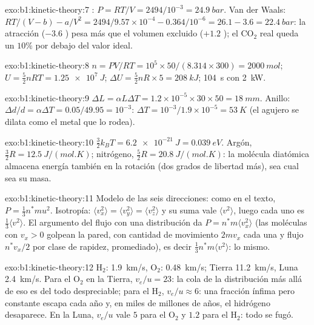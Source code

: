 \begin{solution}{exo:b1:kinetic-theory:7}
: $P = RT/V = 2494/10^{-3} = \qty{24.9}{bar}$. Van der Waals:
$RT/(V - b) - a/V^2 = 2494/9.57\times10^{-4} - 0.364/10^{-6} = 26.1 - 3.6 =
\qty{22.4}{bar}$: la atracción ($-3.6$ ) pesa más que el volumen
excluido ($+1.2$ ); el CO$_2$ real queda un $10\%$ por debajo del valor ideal.
\end{solution}

\begin{solution}{exo:b1:kinetic-theory:8}
$n = PV/RT = 10^5 \times 50/(8.314 \times 300) = \qty{2000}{mol}$; $U = \tfrac52
nRT = \qty{1.25e7}{J}$; $\Delta U = \tfrac52 nR \times 5 = \qty{208}{kJ}$;
\qty{104}{s} con \qty{2}{kW}.
\end{solution}

\begin{solution}{exo:b1:kinetic-theory:9}
$\Delta L = \alpha L\Delta T = 1.2\times10^{-5} \times 30 \times 50 = \qty{18}{mm}$.
Anillo: $\Delta d/d = \alpha\Delta T = 0.05/49.95 = 10^{-3}$: $\Delta T = 10^{-3}/
1.9\times10^{-5} = \qty{53}{K}$ (el agujero se dilata como el metal que lo rodea).
\end{solution}

\begin{solution}{exo:b1:kinetic-theory:10}
$\tfrac32 k_BT = \qty{6.2e-21}{J} = \qty{0.039}{eV}$. Argón, $\tfrac32 R =
\qty{12.5}{J/(mol.K)}$; nitrógeno, $\tfrac52 R = \qty{20.8}{J/(mol.K)}$: la
molécula diatómica almacena energía también en la rotación (dos grados de
libertad más), sea cual sea su masa.
\end{solution}

\begin{solution}{exo:b1:kinetic-theory:11}
Modelo de las seis direcciones: como en el texto, $P = \tfrac13 n^*mu^2$.
Isotropía: $\langle v_x^2\rangle = \langle v_y^2\rangle = \langle v_z^2\rangle$ y
su suma vale $\langle v^2\rangle$, luego cada uno es
$\tfrac13\langle v^2\rangle$. El argumento del flujo con una distribución da
$P = n^*m\langle v_x^2\rangle$ (las moléculas con $v_x > 0$ golpean la pared,
con cantidad de movimiento $2mv_x$ cada una y flujo $n^*v_x/2$ por clase de
rapidez, promediado), es decir $\tfrac13 n^*m\langle v^2\rangle$: lo mismo.
\end{solution}

\begin{solution}{exo:b1:kinetic-theory:12}
H$_2$: \qty{1.9}{km/s}, O$_2$: \qty{0.48}{km/s}; Tierra \qty{11.2}{km/s},
Luna \qty{2.4}{km/s}. Para el O$_2$ en la Tierra, $v_e/u = 23$: la cola de
la distribución más allá de eso es del todo despreciable; para el H$_2$,
$v_e/u \approx 6$: una fracción ínfima pero constante escapa cada año y, en
miles de millones de años, el hidrógeno desaparece. En la Luna, $v_e/u$
vale $5$ para el O$_2$ y $1.2$ para el H$_2$: todo se fugó.
\end{solution}

